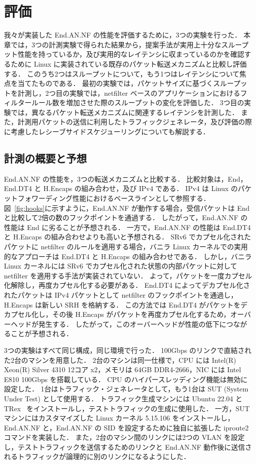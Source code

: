 \chapter{評価}
\label{chap:evaluation}

我々が実装した End.AN.NF の性能を評価するために，3つの実験を行った．
本章では，3つの計測実験で得られた結果から，提案手法が実用上十分なスループット性能を持っているか，及び実用的なレイテンシに収まっているのかを確認するために Linux に実装されている既存のパケット転送メカニズムと比較し評価する．
このうち2つはスループットについて，もう1つはレイテンシについて焦点を当てたものである．
最初の実験では，パケットサイズに基づくスループットを計測し，2つ目の実験では，netfilter ベースのアプリケーションにおけるフィルタールール数を増加させた際のスループットの変化を評価した．
3つ目の実験では，異なるパケット転送メカニズムに関連するレイテンシを計測した．
また，計測用パケットの送信に利用したトラフィックジェネレータ，及び評価の際に考慮したレシーブサイドスケジューリングについても解説する．
\section{計測の概要と予想}
\label{sec:eval-prediction}
End.AN.NF の性能を，3つの転送メカニズムと比較する．
比較対象は，End，End.DT4 と H.Encaps の組み合わせ，及び IPv4 である．
IPv4 は Linux のパケットフォワーディング性能におけるベースラインとして参照する．
図~\ref*{fig:hooks}に示すように，End.AN.NF が動作する場合，受信パケットは End と比較して2倍の数のフックポイントを通過する．
したがって，End.AN.NF の性能は End に劣ることが予想される．
一方で，End.AN.NF の性能は End.DT4 と H.Encaps の組み合わせよりも高いと予想される．
SRv6 でカプセル化されたパケットに netfilter のルールを適用する場合，バニラ Linux カーネルでの実用的なアプローチは End.DT4 と H.Encaps の組み合わせである．
しかし，バニラ Linux カーネルには SRv6 でカプセル化された状態の内部パケットに対して netfilter を適用する手法が実装されていない．
よって，パケットを一度カプセル化解除し，再度カプセル化する必要がある．
End.DT4 によってデカプセル化されたパケットは IPv4 パケットとして netfilter のフックポイントを通過し，H.Encaps は新しい SRH を格納する．
この方法では End.DT4 がパケットをデカプセル化し，その後 H.Encaps がパケットを再度カプセル化するため，オーバーヘッドが発生する．
したがって，このオーバーヘッドが性能の低下につながることが予想される．

3つの実験はすべて同じ構成，同じ環境で行った．
100Gbps のリンクで直結された2台のマシンを用意した．
2台のマシンは同一仕様で，CPU には Intel(R) Xeon(R) Silver 4310 12コア x2，メモリは 64GB DDR4-2666，NIC には Intel E810 100Gbps を搭載している．
CPU のハイパースレッディング機能は無効に設定した．
1台はトラフィック・ジェネレータとして，もう1台は SUT (System Under Test) として使用する．
トラフィック生成マシンには Ubuntu 22.04 と TRex~\cite{trex} をインストールし，テストトラフィックの生成に使用した．
一方，SUT マシンにはカスタマイズした Linux カーネル 5.15.106 をインストールし，End.AN.NF と，End.AN.NF の SID を設定するために独自に拡張した iproute2 コマンドを実装した．
また，2台のマシン間のリンクには2つの VLAN を設定し，テストトラフィックを送信するためのリンクと End.AN.NF 動作後に送信されるトラフィックが論理的に別のリンクになるようにした．


